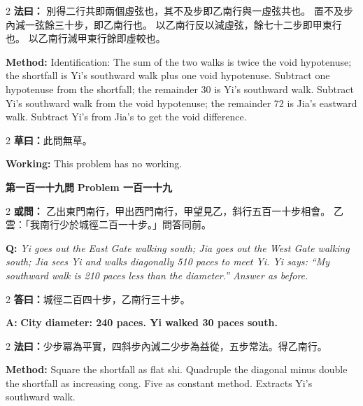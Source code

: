 \documentclass[11pt,a4paper]{article}
\newcommand{\wen}[1]{%
  \par\vspace{0.5em}%
  \noindent\textcolor{problemcolor}{\textbf{第#1問}}%
  \hfill\textcolor{problemcolor}{\textbf{Problem #1}}\par\nopagebreak%
  \vspace{0.3em}%
}
\newcommand{\owen}[1]{%
  \noindent\textcolor{problemcolor}{\textbf{或問：}}{\tradfont #1}\par\nopagebreak%
}
\newcommand{\oweneng}[1]{%
  \noindent\textcolor{engcolor}{\textbf{Q: }}{\itshape #1}\par\nopagebreak%
}
\newcommand{\fayue}[1]{%
  \noindent\textcolor{methodcolor}{\textbf{法曰：}}{\tradfont #1}\par\nopagebreak%
}
\newcommand{\fayueeng}[1]{%
  \noindent\textcolor{engcolor}{\textbf{Method: }}{#1}\par\nopagebreak%
}
\newcommand{\tsaoyue}[1]{%
  \noindent\textcolor{workcolor}{\textbf{草曰：}}{\tradfont #1}\par%
}
\newcommand{\tsaoyueeng}[1]{%
  \noindent\textcolor{engcolor}{\textbf{Working: }}{\small #1}\par%
}
\newcommand{\dayue}[1]{%
  \noindent\textcolor{anscolor}{\textbf{答曰：}}{\tradfont #1}\par\nopagebreak%
}
\newcommand{\dayueeng}[1]{%
  \noindent\textcolor{engcolor}{\textbf{A: }}{\bfseries #1}\par\nopagebreak%
}
\begin{document}
\begin{paracol}{2}
\fayue{%
別得二行共即兩個虛弦也，其不及步即乙南行與一虛弦共也。
置不及步內減一弦餘三十步，即乙南行也。
以乙南行反以減虛弦，餘七十二步即甲東行也。
以乙南行減甲東行餘即虛較也。}
\switchcolumn
\fayueeng{%
Identification: The sum of the two walks is twice the void hypotenuse; the shortfall is Yi's southward walk plus one void hypotenuse. Subtract one hypotenuse from the shortfall; the remainder 30 is Yi's southward walk. Subtract Yi's southward walk from the void hypotenuse; the remainder 72 is Jia's eastward walk. Subtract Yi's from Jia's to get the void difference.}
\end{paracol}

\begin{paracol}{2}
\tsaoyue{此問無草。}
\switchcolumn
\tsaoyueeng{This problem has no working.}
\end{paracol}

\vspace{0.5cm}

\wen{一百一十九}

\begin{paracol}{2}
\owen{%
乙出東門南行，甲出西門南行，甲望見乙，斜行五百一十步相會。
乙雲：「我南行少於城徑二百一十步。」問答同前。}
\switchcolumn
\oweneng{%
Yi goes out the East Gate walking south; Jia goes out the West Gate walking south; Jia sees Yi and walks diagonally 510 paces to meet Yi. Yi says: ``My southward walk is 210 paces less than the diameter.'' Answer as before.}
\end{paracol}

\begin{paracol}{2}
\dayue{城徑二百四十步，乙南行三十步。}
\switchcolumn
\dayueeng{City diameter: 240 paces. Yi walked 30 paces south.}
\end{paracol}

\begin{paracol}{2}
\fayue{少步冪為平實，四斜步內減二少步為益從，五步常法。得乙南行。}
\switchcolumn
\fayueeng{Square the shortfall as flat shi. Quadruple the diagonal minus double the shortfall as increasing cong. Five as constant method. Extracts Yi's southward walk.}
\end{paracol}
\end{document}
